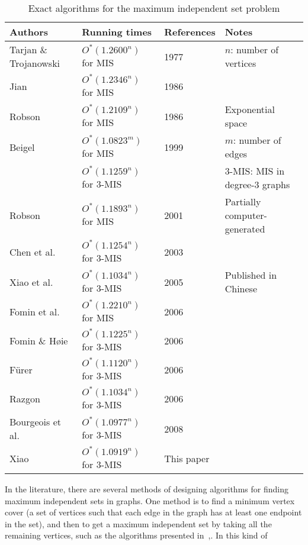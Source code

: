 \documentclass[runningheads]{llncs}
\begin{document}
\begin{table}[htp]\label{table1}
\begin{tabular}{|l|l|l|l|}\hline
\textbf{Authors} & \textbf{Running times} &\textbf{References}& \textbf{Notes}\\
\hline \hline Tarjan \& Trojanowski &$O^*(1.2600^n)$ for MIS&
1977~\cite{Tarjan:IS}&$n$: number of vertices\\ \hline Jian & $O^*(1.2346^n)$ for MIS& 1986~\cite{Jian:Is}&\\
\hline Robson &$O^*(1.2109^n)$ for MIS &1986~\cite{Robson:IS}&Exponential space\\
\hline
 Beigel & $O^*(1.0823^m)$ for MIS
& 1999~\cite{Beigel:is}&$m$: number of edges\\
&$O^*(1.1259^n)$ for $3$-MIS & &$3$-MIS: MIS in degree-$3$ graphs\\
 \hline Robson &$O^*(1.1893^n)$ for MIS &2001~\cite{Robson:IS_1}&Partially computer-generated\\
 \hline Chen et al. & $O^*(1.1254^n)$ for $3$-MIS & 2003~\cite{Chen:labeled3vc}&\\
\hline Xiao et al. & $O^*(1.1034^n)$ for $3$-MIS & 2005~\cite{xiao:IS3}&Published in Chinese\\
\hline Fomin et al. & $O^*(1.2210^n)$ for MIS & 2006~\cite{Fomin:is}&\\
\hline Fomin \& H\o ie & $O^*(1.1225^n)$ for $3$-MIS & 2006~\cite{Fomin:cubicgraph}&\\
\hline F{\"u}rer & $O^*(1.1120^n)$ for $3$-MIS & 2006~\cite{Furer:ISsparse}&\\
\hline Razgon & $O^*(1.1034^n)$ for $3$-MIS & 2006~\cite{Razgon:3IS}&\\
\hline Bourgeois et al. & $O^*(1.0977^n)$ for $3$-MIS &
2008~\cite{Bourgeois:3IS} &\\
\hline Xiao &$O^*(1.0919^n)$ for $3$-MIS& This paper & \\
\hline
\end{tabular}
\vspace{3mm} \caption{Exact algorithms for the maximum independent
set problem}
\end{table}
In the literature, there are several methods of designing
algorithms for finding maximum independent sets in graphs. One
method is to find a minimum vertex cover (a set of vertices such
that each edge in the graph has at least one endpoint in the set),
and then to get a maximum independent set by taking all the
remaining vertices, such as the algorithms presented
in~\cite{Chen:labeled3vc},\cite{VC2005}. In this kind of
\end{document}
